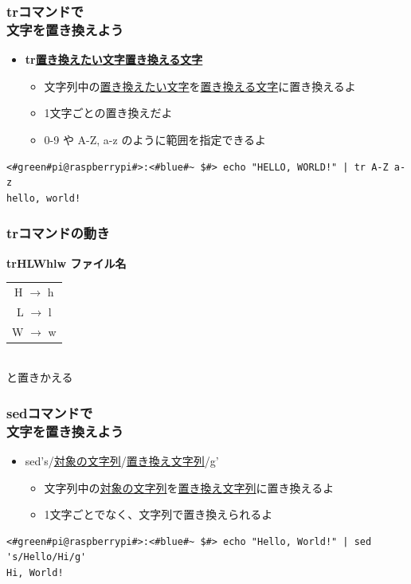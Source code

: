 \documentclass[slide03.tex]{subfiles}
\begin{document}
\begin{frame}[fragile]
    \frametitle{trコマンドで\\文字を置き換えよう}
    \begin{itemize}
        \item {\bf tr\textvisiblespace\underline{置き換えたい文字}\textvisiblespace\underline{置き換える文字}}
        \begin{itemize}
            \small
            \item 文字列中の\underline{置き換えたい文字}を\underline{置き換える文字}に置き換えるよ
            \item 1文字ごとの置き換えだよ
            \item 0-9 や A-Z, a-z のように範囲を指定できるよ
        \end{itemize}
    \end{itemize}
    \begin{lstlisting}[title=範囲指定を使った置き換え, label=tr_range]
<#green#pi@raspberrypi#>:<#blue#~ $#> echo "HELLO, WORLD!" | tr A-Z a-z
hello, world!
    \end{lstlisting}
\end{frame}

\begin{frame}
    \frametitle{trコマンドの動き}
    \begin{center}
        {\bf tr\textvisiblespace HLW\textvisiblespace hlw ファイル名}\\
        \vspace{\zh}
        \begin{tabular}{c}
        H $\rightarrow$ h \\
        L $\rightarrow$ l \\
        W $\rightarrow$ w \\
        \end{tabular}\\
        と置きかえる
    \end{center}
\end{frame}

\begin{frame}[fragile]
    \frametitle{sedコマンドで\\文字を置き換えよう}
    \begin{itemize}
        \item sed\textvisiblespace 's/\underline{対象の文字列}/\underline{置き換え文字列}/g'
        \begin{itemize}
            \small
            \item 文字列中の\underline{対象の文字列}を\underline{置き換え文字列}に置き換えるよ
            \item 1文字ごとでなく、文字列で置き換えられるよ
        \end{itemize}
    \end{itemize}
    \begin{lstlisting}[title=sedでの文字の置き換え, label=sed_app]
<#green#pi@raspberrypi#>:<#blue#~ $#> echo "Hello, World!" | sed 's/Hello/Hi/g'
Hi, World!
    \end{lstlisting}
\end{frame}
\end{document}
